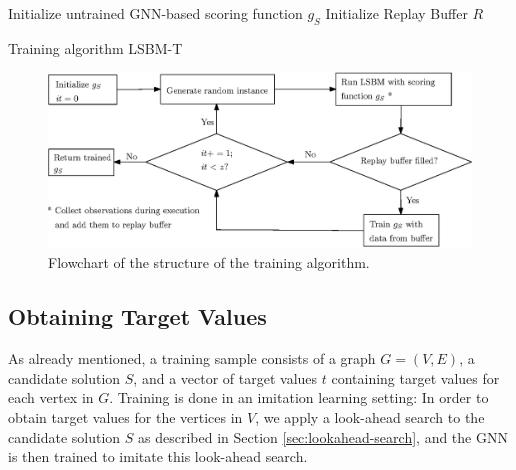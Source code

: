 \documentclass[draft,final]{vutinfth} %
\begin{document}
\begin{algorithm}
    \DontPrintSemicolon
    Initialize untrained GNN-based scoring function $g_S$ \; 
    Initialize Replay Buffer $R$ \;
    \caption{Training algorithm LSBM-T}
    \label{alg:training}
\end{algorithm}

\begin{figure}
    \centering
    \includegraphics[width=\textwidth]{graphics/flowchart_training_algorithm.eps}
    \caption{Flowchart of the structure of the training algorithm.}
    \label{fig:flowchart-training-algorithm}
\end{figure}

\subsection{Obtaining Target Values}\label{subsec:target-values}
As already mentioned, a training sample consists of a graph $G = (V,E)$, a candidate solution $S$, and a vector of target values $t$ containing target values for each vertex in $G$. Training is done in an imitation learning setting: In order to obtain target values for the vertices in $V$, we apply a look-ahead search to the candidate solution $S$ as described in Section \ref{sec:lookahead-search}, and the GNN is then trained to imitate this look-ahead search. 
\end{document}
